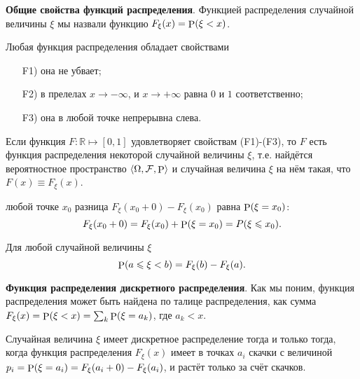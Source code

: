 \textbf{Общие свойства функций распределения}. Функцией распределения случайной величины $\xi$ мы назвали функцию $F_\xi (x) = \P (\xi < x)$. 

\begin{to_thr}
    Любая функция распределения обладает свойствами
    \begin{itemize}
        \item[F1)] она не убвает;
        \item[F2)] в прелелах $x \to - \infty$, и $x \to + \infty$ равна $0$ и $1$ соответственно;
        \item[F3)] она в любой точке непрерывна слева.
    \end{itemize}
\end{to_thr}


\begin{to_thr}[]
    Если функция $F \colon \mathbb{R} \mapsto [0, 1]$ удовлетворяет свойствам (F1)-(F3), то $F$ есть функция распределения некоторой случайной величины $\xi$, т.е. найдётся вероятностное пространство $\langle \Omega, \mathcal F, \P \rangle$ и случайная величина $\xi$ на нём такая, что $F(x) \equiv F_\xi (x)$. 
\end{to_thr}

\begin{to_lem}
     любой точке $x_0$ разница $F_\xi (x_0 + 0) - F_{\xi} (x_0)$ равна $\P (\xi = x_0)$:
     \begin{equation*}
          F_\xi (x_0 + 0) = F_\xi (x_0) + \P (\xi = x_0) = P (\xi \leq x_0).
      \end{equation*} 
\end{to_lem}

\begin{to_lem}
    Для любой случайной величины $\xi$
    \begin{equation*}
        \P (a \leq \xi < b) = F_\xi (b) - F_\xi (a).
    \end{equation*}
\end{to_lem}




\textbf{Функция распределения дискретного распределения}. Как мы поним, функция распределения может быть найдена по талице распределения, как сумма $F_\xi (x) = \P( \xi < x) = \sum_k \P(\xi = a_k)$, где $a_k < x$.

\begin{to_lem}
    Случайная величина $\xi$ имеет дискретное распределение тогда и только тогда, когда функция распределения $F_\xi (x)$ имеет в точках $a_i$ скачки с величиной $p_i = \P(\xi = a_i) = F_\xi (a_i +0) - F_\xi (a_i)$, и растёт только за счёт скачков.
\end{to_lem}



